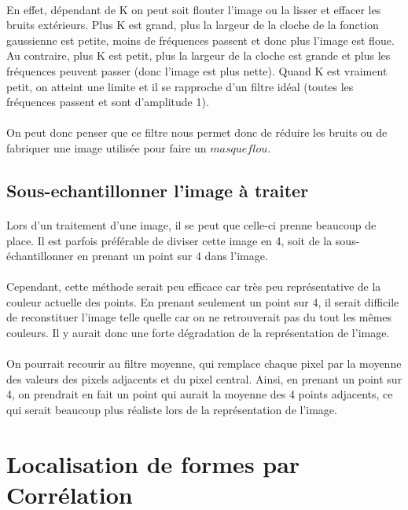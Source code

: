 \documentclass{article}
\begin{document}
\paragraph{}
En effet, dépendant de K on peut soit flouter l’image ou la lisser et effacer les bruits extérieurs. Plus K est grand, plus la largeur de la cloche de la fonction gaussienne est petite, moins de fréquences passent et donc plus l’image est floue. Au contraire, plus K est petit, plus la largeur de la cloche est grande et plus les fréquences peuvent passer (donc l’image est plus nette). Quand K est vraiment petit, on atteint une limite et il se rapproche d’un filtre idéal (toutes les fréquences passent et sont d’amplitude 1). 
\paragraph{}
On peut donc penser que ce filtre nous permet donc de réduire les bruits ou de fabriquer une image utilisée pour faire un $ masque flou $.
\subsection{Sous-echantillonner l'image à traiter}
\paragraph{}
\justifying
Lors d’un traitement d’une image, il se peut que celle-ci prenne beaucoup de place. Il est parfois préférable de diviser cette image en 4, soit de la sous-échantillonner en prenant un point sur 4 dans l’image. 
\paragraph{}
Cependant, cette méthode serait peu efficace car très peu représentative de la couleur actuelle des points. En prenant seulement un point sur 4, il serait difficile de reconstituer l’image telle quelle car on ne retrouverait pas du tout les mêmes couleurs. Il y aurait donc une forte dégradation de la représentation de l’image.
\paragraph{}
On pourrait recourir au filtre moyenne, qui remplace chaque pixel par la moyenne des valeurs des pixels adjacents et du pixel central. Ainsi, en prenant un point sur 4, on prendrait en fait un point qui aurait la moyenne des 4 points adjacents, ce qui serait beaucoup plus réaliste lors de la représentation de l’image.


\newpage
\section{Localisation de formes par Corrélation}
\end{document}
